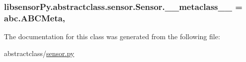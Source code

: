 \subsubsection[{\+\_\+\+\_\+metaclass\+\_\+\+\_\+}]{\setlength{\rightskip}{0pt plus 5cm}libsensor\+Py.\+abstractclass.\+sensor.\+Sensor.\+\_\+\+\_\+metaclass\+\_\+\+\_\+ = abc.\+A\+B\+C\+Meta\hspace{0.3cm}{\ttfamily [static]}, {\ttfamily [private]}}\label{classlibsensorPy_1_1abstractclass_1_1sensor_1_1Sensor_a26b6e84d38a6408de3330123fca91335}


The documentation for this class was generated from the following file\+:\begin{DoxyCompactItemize}
\item 
abstractclass/\hyperlink{abstractclass_2sensor_8py}{sensor.\+py}\end{DoxyCompactItemize}
